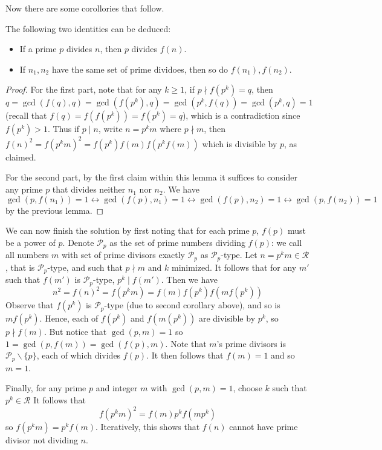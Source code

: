 \documentclass[11pt,a4paper]{article}
\begin{document}
\begin{enumerate}
    	Now there are some corollories that follow. 
    	\begin{lemma}
    		The following two identities can be deduced: 
    		\begin{itemize}
    			\item If a prime $p$ divides $n$, then $p$ divides $f(n)$. 
    			
    			\item If $n_1, n_2$ have the same set of prime dividoes, then so do $f(n_1), f(n_2)$. 
    		\end{itemize}
    	\end{lemma}
    
        \begin{proof}
        	For the first part, note that for any $k\ge 1$, 
        	if $p\nmid f(p^k)=q$, then $q = \gcd(f(q), q) = \gcd(f(p^k), q) = \gcd(p^k, f(q)) = \gcd(p^k, q) = 1$ 
        	(recall that $f(q)=f(f(p^k))=f(p^k)=q$), 
        	which is a contradiction since $f(p^k) > 1$. 
        	Thus if $p\mid n$, write $n = p^km$ where $p\nmid m$, 
        	then $f(n)^2=f(p^km)^2=f(p^k)f(m)f(p^kf(m))$ which is divisible by $p$, as claimed. 
        	
        	For the second part, by the first claim within this lemma it suffices to consider any prime $p$ that divides neither $n_1$ nor $n_2$. 
        	We have 
        	\[
        	\gcd(p, f(n_1)) = 1 \leftrightarrow \gcd(f(p), n_1) = 1 \leftrightarrow \gcd(f(p), n_2) = 1
        	\leftrightarrow \gcd(p, f(n_2)) = 1
        	\]
        	by the previous lemma. 
        \end{proof}
    	
    	We can now finish the solution by first noting that for each prime $p$, $f(p)$ must be a power of $p$. 
    	Denote $\mathcal{P}_p$ as the set of prime numbers dividing $f(p)$: 
    	we call all numbers $m$ with set of prime divisors exactly $\mathcal{P}_p$ as $\mathcal{P}_p$-type. 
    	Let $n = p^km\in\mathcal{R}$, that is $\mathcal{P}_p$-type, 
    	and such that $p\nmid m$ and $k$ minimized. 
    	It follows that for any $m'$ such that $f(m')$ is $\mathcal{P}_p$-type, 
    	$p^k\mid f(m')$. 
    	Then we have 
    	\[
    	n^2 = f(n)^2 = f(p^km) = f(m)f(p^k)f(mf(p^k))
    	\]
    	Observe that $f(p^k)$ is $\mathcal{P}_p$-type (due to second corollary above), 
    	and so is $mf(p^k)$. 
    	Hence, each of $f(p^k)$ and $f(m(p^k))$ are divisible by $p^k$, 
    	so $p\nmid f(m)$. 
    	But notice that $\gcd(p, m)=1$ so $1 = \gcd(p, f(m)) = \gcd(f(p), m)$. 
    	Note that $m$'s prime divisors is $\mathcal{P}_p\backslash\{p\}$, 
    	each of which divides $f(p)$. 
    	It then follows that $f(m) = 1$ and so $m = 1$. 
    	
    	Finally, for any prime $p$ and integer $m$ with $\gcd(p, m) = 1$, 
    	choose $k$ such that $p^k\in \mathcal{R}$
    	It follows that 
    	\[
    	f(p^km)^2= f(m)p^kf(mp^k)
    	\]
    	so $f(p^km)= p^kf(m)$. Iteratively, this shows that $f(n)$ cannot have prime divisor not dividing $n$. 
    \end{enumerate}
    
\end{document}
